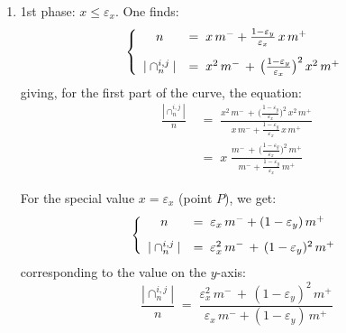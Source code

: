 \documentclass[twocolumn,english]{article}
\begin{document}
\begin{enumerate}
   \item 1st phase: $x \leq \varepsilon_x$. One finds: 
   \begin{equation}
   \left\lbrace
      \begin{array}{cl}
      \vspace{0.3cm}
   n &= \; x \, m^{-} + \frac{1 - \varepsilon_y}{\varepsilon_x} \, x \, m^{+} \\
   |\cap_n^{i,j}| &= \; x^2 \, m^{-} \, + \, \bigl(\frac{1 - \varepsilon_y}{\varepsilon_x}\bigr)^2 \, x^2 \, m^{+}
      \end{array}
   \right.
   \end{equation}
   giving, for the first part of the curve, the equation:
   \begin{align}
   \frac{|\cap_n^{i,j}|}{n} \; &= \; \frac{x^2 \, m^{-} \, + \, \bigl(\frac{1 - \varepsilon_y}{\varepsilon_x}\bigr)^2 \, x^2 \, m^{+}}
   {x \, m^{-} + \frac{1 - \varepsilon_y}{\varepsilon_x} \, x \, m^{+}} \nonumber \\
   \; &= \; x\; \frac{m^{-} \, + \, \bigl(\frac{1 - \varepsilon_y}{\varepsilon_x}\bigr)^2 \, m^{+}}
   {m^{-} + \frac{1 - \varepsilon_y}{\varepsilon_x} \, m^{+}}
   \end{align}
   
   For the special value $x = \varepsilon_x$ (point $P$), we get: 
   \begin{equation}
   \left\lbrace
      \begin{array}{cl}
      \vspace{0.3cm}
   n &= \; \varepsilon_x \, m^{-} + (1 - \varepsilon_y) \, m^{+} \\
   |\cap_n^{i,j}| &= \; \varepsilon_x^2 \, m^{-} \, + \, ({1 - \varepsilon_y})^2 \,  m^{+}
      \end{array}
   \right.
   \end{equation}
   corresponding to the value on the $y$-axis: 
   \begin{equation}
   \frac{|\cap_n^{i,j}|}{n} \; = \; \frac{\varepsilon_x^2 \, m^{-} \, + \, ({1 - \varepsilon_y})^2 \,  m^{+}}
   {\varepsilon_x \, m^{-} + (1 - \varepsilon_y) \, m^{+}}
   \end{equation}


\end{enumerate}
\end{document}
